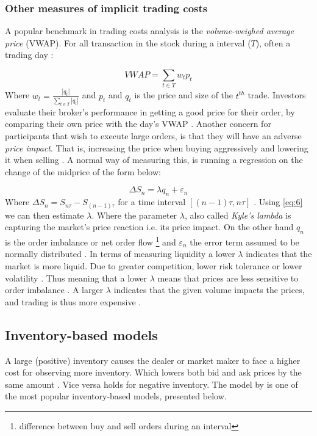\documentclass{kththesis}
\theoremstyle{definition}
\begin{document}
\subsubsection*{Other measures of implicit trading costs}
A popular benchmark in trading costs analysis is the \textit{volume-weighed average price} (VWAP). For all transaction in the stock during a interval ($T$), often a trading day \parencite{foucault2013market}:

\begin{equation}
    \label{eq:5}
    VWAP = \sum_{t\in T}{w_t p_t}
\end{equation}
Where $w_t = \frac{|q_t|}{\sum_{t\in T}{|q_t|}}$ and $p_t$ and $q_t$ is the price and size of the $t^{th}$ trade. Investors evaluate their broker's performance in getting a good price for their order, by comparing their own price with the day's VWAP \parencite{foucault2013market}. Another concern for participants that wish to execute large orders, is that they will have an adverse \textit{price impact}. That is, increasing the price when buying aggressively and lowering it when selling \parencite{cartea2015algorithmic, bouchaud2018trades}. A normal way of measuring this, is running a regression on the change of the midprice of the form below:

\begin{equation}
    \label{eq:6}
    \Delta S_n = \lambda q_n + \varepsilon_n
\end{equation}
Where $\Delta S_n = S_{n\tau}-S_{(n-1)\tau}$ for a time interval $[(n-1)\tau, n\tau]$ \parencite{cartea2015algorithmic}. Using \autoref{eq:6} we can then estimate $\lambda$. Where the parameter $\lambda$, also called \textit{Kyle's lambda} \parencite{bouchaud2018trades} is capturing the market's price reaction i.e. its price impact. On the other hand $q_n$ is the order imbalance or net order flow \footnote{difference between buy and sell orders during an interval} and  $\varepsilon_n$ the error term assumed to be normally distributed \parencite{cartea2015algorithmic, foucault2013market}. In terms of measuring liquidity a lower $\lambda$ indicates that the market is more liquid. Due to greater competition, lower risk tolerance or lower volatility \parencite{cartea2015algorithmic}. Thus meaning that a lower $\lambda$ means that prices are less sensitive to order imbalance \parencite{foucault2013market}.  A larger $\lambda$ indicates that the given volume impacts the prices, and trading is thus more expensive \parencite{bouchaud2018trades}.

\subsection{Inventory-based models}
A large (positive) inventory causes the dealer or market maker to face a higher cost for observing more inventory. Which lowers both bid and ask prices by the same amount \parencite{o1995market}. Vice versa holds for negative inventory. The model by \textcite{ho1981optimal} is one of the most popular inventory-based models, presented below.
\end{document}
